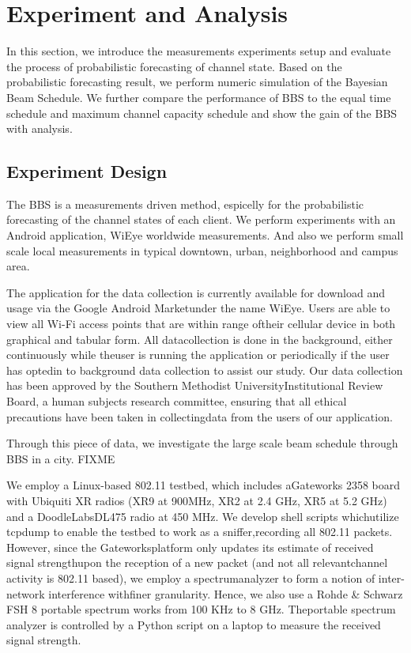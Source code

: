 \section{Experiment and Analysis}
\label{sec:experiment}

In this section, we introduce the measurements experiments setup and 
evaluate the process of probabilistic forecasting of channel state.
Based on the probabilistic forecasting result, we perform numeric
simulation of the Bayesian Beam Schedule. We further compare the 
performance of BBS to the equal time schedule and maximum channel 
capacity schedule and show the gain of the BBS with analysis.


\subsection{Experiment Design}
\label{subsec:experimentdesign}

The BBS is a measurements driven method, espicelly for the probabilistic forecasting
of the channel states of each client. We perform experiments with an Android application, 
WiEye worldwide measurements. And also we perform small scale local measurements in typical downtown,
urban, neighborhood and campus area.

The application for the data collection is currently available for download and usage via the Google 
Android Marketunder the name WiEye. Users are able to view all Wi-Fi access points that are within range 
oftheir cellular device in both graphical and tabular form. All datacollection is done in the background, 
either continuously while theuser is running the application or periodically if the user has optedin to 
background data collection to assist our study. Our data collection has been approved by the Southern 
Methodist UniversityInstitutional Review Board, a human subjects research committee, ensuring that all 
ethical precautions have been taken in collectingdata from the users of our application.

Through this piece of data, we investigate the large scale beam schedule through BBS in a city.
FIXME

We employ a Linux-based 802.11 testbed, which includes aGateworks 2358 board with Ubiquiti XR radios 
(XR9 at 900MHz, XR2 at 2.4 GHz, XR5 at 5.2 GHz) and a DoodleLabsDL475 radio at 450 MHz. We develop shell 
scripts whichutilize tcpdump to enable the testbed to work as a sniffer,recording all 802.11 packets. 
However, since the Gateworksplatform only updates its estimate of received signal strengthupon the 
reception of a new packet (and not all relevantchannel activity is 802.11 based), we employ a spectrumanalyzer 
to form a notion of inter-network interference withfiner granularity. Hence, we also use a Rohde \& Schwarz FSH 8 
portable spectrum works from 100 KHz to 8 GHz. Theportable spectrum analyzer is controlled by a Python 
script on a laptop to measure the received signal strength.

